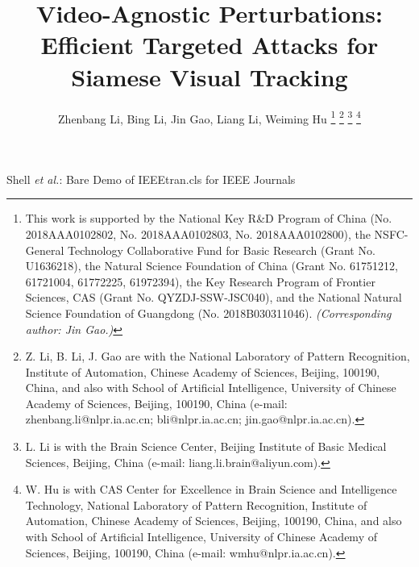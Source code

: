 \documentclass[journal]{IEEEtran}
\begin{document}
\title{Video-Agnostic Perturbations: Efficient Targeted Attacks for Siamese Visual Tracking}
\author{Zhenbang Li, Bing Li, Jin Gao, Liang Li, Weiming Hu
\thanks{This work is supported by the National Key R\&D Program of China (No. 2018AAA0102802, No. 2018AAA0102803, No. 2018AAA0102800), the NSFC-General Technology Collaborative Fund for Basic Research (Grant No. U1636218), the Natural Science Foundation of China (Grant No. 61751212, 61721004, 61772225, 61972394), the Key Research Program of Frontier Sciences, CAS (Grant No. QYZDJ-SSW-JSC040), and the National Natural Science Foundation of Guangdong (No. 2018B030311046). \textit{(Corresponding author: Jin Gao.)}}
\thanks{Z. Li, B. Li, J. Gao are with the National Laboratory of Pattern Recognition, Institute of Automation, Chinese Academy of Sciences, Beijing, 100190, China, and also with School of Artificial Intelligence, University of Chinese Academy of Sciences, Beijing, 100190, China (e-mail: zhenbang.li@nlpr.ia.ac.cn; bli@nlpr.ia.ac.cn; jin.gao@nlpr.ia.ac.cn).}
\thanks{L. Li is with the Brain Science Center, Beijing Institute of Basic Medical Sciences, Beijing, China (e-mail: liang.li.brain@aliyun.com).}
\thanks{W. Hu is with CAS Center for Excellence in Brain Science and Intelligence Technology, National Laboratory of Pattern Recognition, Institute of Automation, Chinese Academy of Sciences, Beijing, 100190, China, and also with School of Artificial Intelligence, University of Chinese Academy of Sciences, Beijing, 100190, China (e-mail: wmhu@nlpr.ia.ac.cn).}
}
{Shell \MakeLowercase{\textit{et al.}}: Bare Demo of IEEEtran.cls for IEEE Journals}
\maketitle
\end{document}
